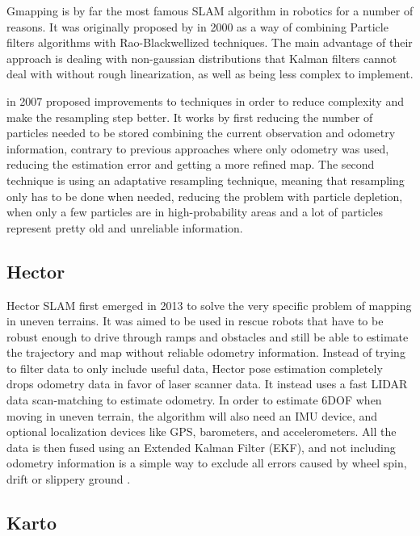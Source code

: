 Gmapping is by far the most famous SLAM algorithm in robotics for a number of reasons. It was originally proposed by \citeauthor{doucet2000rao} in 2000 as a way of combining Particle filters algorithms with Rao-Blackwellized techniques. The main advantage of their approach is dealing with non-gaussian distributions that Kalman filters cannot deal with without rough linearization, as well as being less complex to implement.

\citeauthor{grisetti2007improved} in 2007 proposed improvements to \citeauthor{doucet2000rao} techniques in order to reduce complexity and make the resampling step better. It works by first reducing the number of particles needed to be stored combining the current observation and odometry information, contrary to previous approaches where only odometry was used, reducing the estimation error and getting a more refined map. The second technique is using an adaptative resampling technique, meaning that resampling only has to be done when needed, reducing the problem with particle depletion, when only a few particles are in high-probability areas and a lot of particles represent pretty old and unreliable information.

\subsection{Hector}

Hector SLAM first emerged in 2013 to solve the very specific problem of mapping in uneven terrains. It was aimed to be used in rescue robots that have to be robust enough to drive through ramps and obstacles and still be able to estimate the trajectory and map without reliable odometry information. Instead of trying to filter data to only include useful data, Hector pose estimation completely drops odometry data in favor of laser scanner data. It instead uses a fast LIDAR data scan-matching to estimate odometry. In order to estimate 6DOF when moving in uneven terrain, the algorithm will also need an IMU device, and optional localization devices like GPS, barometers, and accelerometers. All the data is then fused using an Extended Kalman Filter (EKF), and not including odometry information is a simple way to exclude all errors caused by wheel spin, drift or slippery ground \cite{kohlbrecher2011flexible}.

\subsection{Karto}


